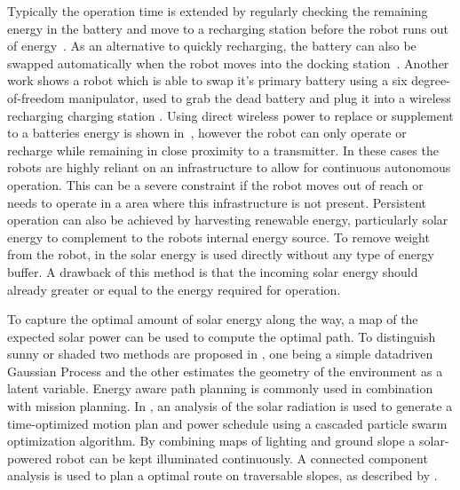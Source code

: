 \documentclass[letterpaper, 10 pt, conference]{ieeeconf}  %
\begin{document}

Typically the operation time is extended by regularly checking the remaining energy in the battery and move to a recharging station before the robot runs out of energy~\cite{pickem_icra_2015, rubenstein_icra_2012}.
As an alternative to quickly recharging, the battery can also be swapped automatically when the robot moves into the docking station~\cite{kemal_mech_2015}.
Another work shows a robot which is able to swap it's primary battery using a six degree-of-freedom manipulator, used to grab the dead battery and plug it into a wireless recharging charging station \cite{zhang_conel_2013}.
Using direct wireless power to replace or supplement to a batteries energy is shown in~\cite{karpelson_icra_2014}, however the robot can only operate or recharge while remaining in close proximity to a transmitter. 
In these cases the robots are highly reliant on an infrastructure to allow for continuous autonomous operation.
This can be a severe constraint if the robot moves out of reach or needs to operate in a area where this infrastructure is not present. Persistent operation can also be achieved by harvesting renewable energy, particularly solar energy to complement to the robots internal energy source. To remove weight from the robot, in \cite{bruhwiler_iros_2015} the solar energy is used directly without any type of energy buffer. A drawback of this method is that the incoming solar energy should already greater or equal to the energy required for operation. 


To capture the optimal amount of solar energy along the way, a map of the expected solar power can be used to compute the optimal path. To distinguish sunny or shaded two methods are proposed in \cite{plonski_tranro_2016}, one being a simple datadriven Gaussian Process and the other estimates the geometry of the environment as a latent variable.
Energy aware path planning is commonly used in combination with mission planning.
In \cite{kaplan_iros_2016}, an analysis of the solar radiation is used to generate a time-optimized motion plan and power schedule using a cascaded particle swarm optimization algorithm.
By combining maps of lighting and ground slope a solar-powered robot can be kept illuminated continuously. A connected component analysis is used to plan a optimal route on traversable slopes, as described by \cite{otten_icra_2015}.
\end{document}
